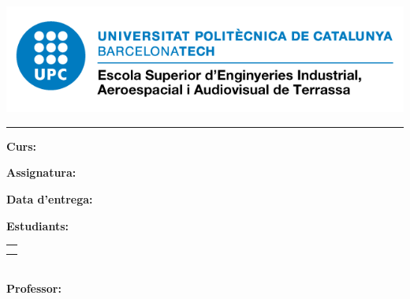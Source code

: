 
\thispagestyle{CoverPage}


\begin{center}\bf
\vspace{80pt}
{\large \School}

\vspace{10pt}
\includegraphics[scale=0.5]{./doc_config/image}\par

\vspace{80pt}
{\fontsize{30pt}{30pt}\selectfont \ProjectName}

\vspace{10pt}
{\Huge \SubName}

\vspace{10pt}
\textcolor{UPC_blue}{\rule{\textwidth}{.6pt}}
{\Large \DocType}
\end{center}

\vspace{130pt}

\textbf{Curs:} \Degree

\textbf{Assignatura:} \Course

\textbf{Data d'entrega:} \DocDate\\

\vspace{10pt}

\textbf{Estudiants:}\vspace{7pt}

\begin{tabular}{l}
	\Studi   \\
	\Studii   \\
	
\end{tabular}\\

\vspace{10pt}
\textbf{Professor:} \Professor